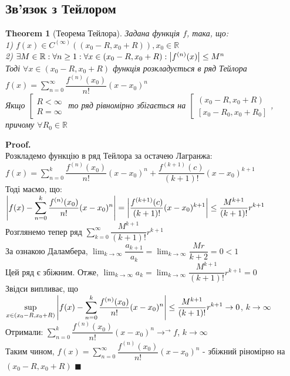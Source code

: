 \documentclass[a4paper, 14pt]{extarticle}
\def\huge{\displaystyle}
\theoremstyle{theoremdd}
\newtheorem{theorem}{Theorem}[subsection]
\theoremstyle{theoremdd}
\theoremstyle{theoremdd}
\theoremstyle{theoremdd}
\theoremstyle{theoremdd}
\theoremstyle{theoremdd}
\theoremstyle{theoremdd}
\theoremstyle{theoremdd}
\newenvironment{pf}{\vspace*{-3mm} \textbf{Proof. \\}}{$\blacksquare$}
\begin{document}
\subsection{Зв'язок з Тейлором}
\begin{theorem}[Теорема Тейлора]
Задана функція $f$, така, що:\\
1) $f(x) \in C^{(\infty)}((x_0-R,x_0+R)), x_0 \in \mathbb{R}$\\
2) $\exists M \in \mathbb{R}: \forall n \geq 1: \forall x \in (x_0-R, x_0+R): \abs{f^{(n)}(x)} \leq M^n$\\
Тоді $\forall x \in (x_0-R, x_0+R)$ функція розкладується в ряд Тейлора\\
$f(x) = \huge \sum_{n=0}^\infty \dfrac{f^{(n)}(x_0)}{n!}(x-x_0)^n$\\
Якщо $\left[ \begin{gathered} R < \infty \\ R = \infty \end{gathered} \right.$ то ряд рівномірно збігається на $\left[ \begin{gathered} (x_0-R,x_0+R) \\ [x_0-R_0,x_0+R_0] \end{gathered} \right.$, причому $\forall R_0 \in \mathbb{R}$
\end{theorem}

\begin{pf}
Розкладемо функцію в ряд Тейлора за остачею Лагранжа:\\
$f(x) = \huge \sum_{n=0}^k \dfrac{f^{(n)}(x_0)}{n!}(x-x_0)^n + \dfrac{f^{(k+1)}(c)}{(k+1)!}(x-x_0)^{k+1}$\\
Тоді маємо, що:\\
$\huge \abs{f(x) - \sum_{n=0}^k \dfrac{f^{(n)}(x_0)}{n!}(x-x_0)^n} = \abs{\dfrac{f^{(k+1)}(c)}{(k+1)!}(x-x_0)^{k+1}} \leq \dfrac{M^{k+1}}{(k+1)!}r^{k+1}$\\
Розглянемо тепер ряд $\huge \sum_{k=0}^\infty \dfrac{M^{k+1}}{(k+1)!} r^{k+1}$\\
За ознакою Даламбера, $\huge \lim_{k \to \infty} \dfrac{a_{k+1}}{a_k} = \huge \lim_{k \to \infty} \dfrac{Mr}{k+2} = 0 < 1$\\
Цей ряд є збіжним. Отже, $\huge \lim_{k \to \infty} a_k = \huge\lim_{k \to \infty} \dfrac{M^{k+1}}{(k+1)!} r^{k+1} = 0$\\
Звідси випливає, що\\
$\huge \sup_{x \in (x_0-R,x_0+R)} \abs{f(x) - \sum_{n=0}^k \dfrac{f^{(n)}(x_0)}{n!}(x-x_0)^n} \leq \dfrac{M^{k+1}}{(k+1)!}r^{k+1} \to 0$, $k \to \infty$\\
Отримали: $\huge \sum_{n=0}^k \dfrac{f^{(n)}(x_0)}{n!}(x-x_0)^n {\rightarrow}^{\rightarrow} f$, $k \to \infty$\\
Таким чином, $f(x) = \huge \sum_{n=0}^\infty \dfrac{f^{(n)}(x_0)}{n!}(x-x_0)^n$ - збіжний ріномірно на \\ $(x_0-R,x_0+R)$
\end{pf}
\end{document}
